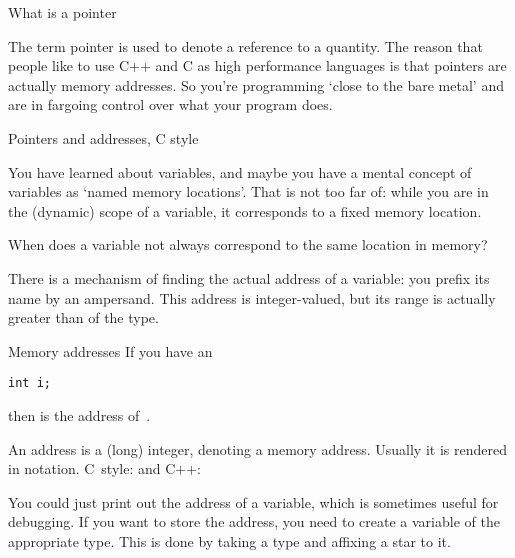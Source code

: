 
 {What is a pointer}

The term pointer is used to denote a reference to a quantity. The
reason that people like to use C++ and C as high performance languages is
that pointers are actually memory addresses. So you're programming
`close to the bare metal' and are in fargoing control over what your program
does.

 {Pointers and addresses, C style}
\label{sec:cderef}

You have learned about variables, and maybe you have a mental concept
of variables as `named memory locations'. That is not too far of:
while you are in the (dynamic) scope of a variable, it corresponds to
a fixed memory location.

\begin{exercise}
  \label{ex:varmemscope}
  When does a variable not always correspond to the same location in
  memory?
\end{exercise}

There is a mechanism of finding the actual address of a variable: you
prefix its name by an ampersand. 
This address is integer-valued, but
its range is actually greater than of the  type.

\begin{block}{Memory addresses}
  \label{sl:ampersand}
  If you have an
\begin{verbatim}
int i;
\end{verbatim}
then  is the address of~.

An address is a (long) integer, denoting a memory address. Usually it
is rendered in  notation. C~style:
%
%
and C++:
%
\end{block}

You could just print out the address of a variable, which is sometimes
useful for debugging. If you want to store the address, you need to
create a variable of the appropriate type. This is done by taking a
type and affixing a star to it.

